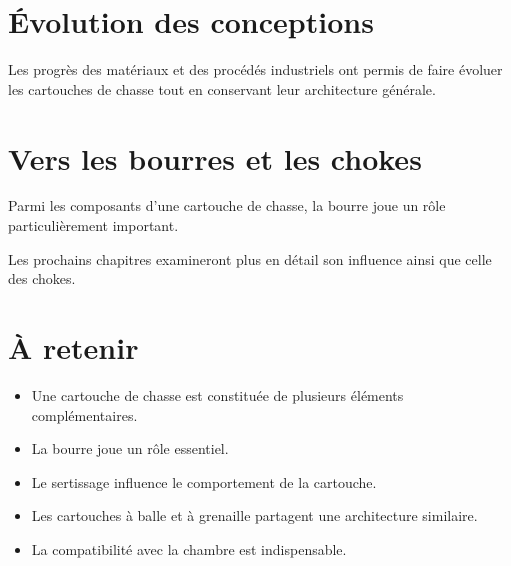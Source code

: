 \section{Évolution des conceptions}

Les progrès des matériaux et des procédés industriels ont permis de faire
évoluer les cartouches de chasse tout en conservant leur architecture
générale.

\section{Vers les bourres et les chokes}

Parmi les composants d'une cartouche de chasse, la bourre joue un rôle
particulièrement important.

Les prochains chapitres examineront plus en détail son influence ainsi que
celle des chokes.

\section{À retenir}

\begin{aretenir}

\begin{itemize}
    \item Une cartouche de chasse est constituée de plusieurs éléments
          complémentaires.
    \item La bourre joue un rôle essentiel.
    \item Le sertissage influence le comportement de la cartouche.
    \item Les cartouches à balle et à grenaille partagent une architecture
          similaire.
    \item La compatibilité avec la chambre est indispensable.
\end{itemize}

\end{aretenir}

